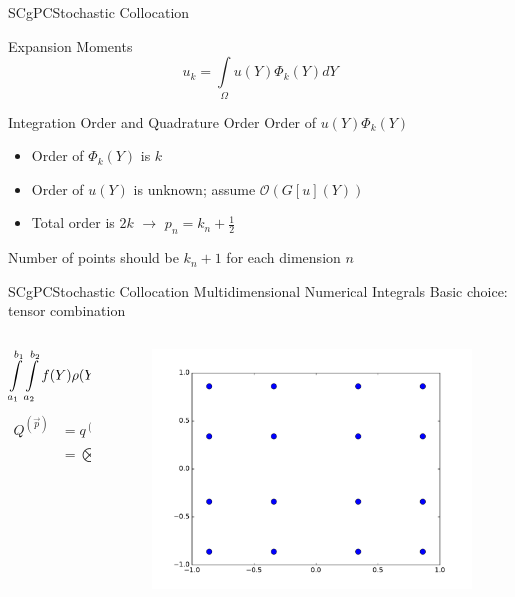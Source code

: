 \documentclass{beamer}
\begin{document}
\begin{frame}{SCgPC}{Stochastic Collocation}\vspace{-20pt}
  \begin{alertblock}{Expansion Moments}
    \[u_k = \int\limits_\Omega u(Y)\Phi_k(Y) dY\]
  \end{alertblock}
  Integration Order and Quadrature Order
  Order of $u(Y)\Phi_k(Y)$
  \begin{itemize}
    \item Order of $\Phi_k(Y)$ is $k$
    \item Order of $u(Y)$ is unknown; assume $\mathcal{O}(G[u](Y))$
    \item Total order is $2k$ $\to$ $p_n = k_n+\frac{1}{2}$
  \end{itemize}
  Number of points should be $k_n+1$ for each dimension $n$
\end{frame}


\begin{frame}{SCgPC}{Stochastic Collocation}\vspace{-20pt}
  Multidimensional Numerical Integrals
  \vfill
  Basic choice: tensor combination
  \begin{columns}
    \begin{column}{0.6\textwidth}
      \begin{equation*}
        \int\limits_{a_1}^{b_1}\int\limits_{a_2}^{b_2} f(Y) \rho(Y)\ dy_2\ dy_1 \approx Q^{(\vec p)}\qty[f(Y)]
      \end{equation*}
      \begin{align*}
        Q^{(\vec p)} &= q^{(p_1)} \otimes q^{(p_2)} \\
          &= \bigotimes_{n=1}^N q^{(p_n)}
      \end{align*}
    \end{column}
    \begin{column}{0.4\textwidth}
    \begin{figure}[h!]
      \centering
      \includegraphics[width=\linewidth]{tensor_quad}
    \end{figure}
    \end{column}
  \end{columns}
\end{frame}
\end{document}
